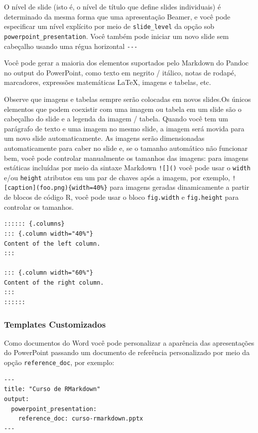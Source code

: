 \documentclass[
]{book}
\begin{document}
O nível de slide (isto é, o nível de título que define slides individuais) é determinado da mesma forma que uma apresentação Beamer, e você pode especificar um nível explícito por meio de \texttt{slide\_level} da opção sob \texttt{powerpoint\_presentation}. Você também pode iniciar um novo slide sem cabeçalho usando uma régua horizontal \texttt{-\/-\/-}

Você pode gerar a maioria dos elementos suportados pelo Markdown do Pandoc no output do PowerPoint, como texto em negrito / itálico, notas de rodapé, marcadores, expressões matemáticas LaTeX, imagens e tabelas, etc.

Observe que imagens e tabelas sempre serão colocadas em novos slides.Os únicos elementos que podem coexistir com uma imagem ou tabela em um slide são o cabeçalho do slide e a legenda da imagem / tabela. Quando você tem um parágrafo de texto e uma imagem no mesmo slide, a imagem será movida para um novo slide automaticamente. As imagens serão dimensionadas automaticamente para caber no slide e, se o tamanho automático não funcionar bem, você pode controlar manualmente os tamanhos das imagens: para imagens estáticas incluídas por meio da sintaxe Markdown \texttt{!{[}{]}()} você pode usar o \texttt{width} e/ou \texttt{height} atributos em um par de chaves após a imagem, por exemplo, \texttt{!{[}caption{]}(foo.png)\{width=40\%\}} para imagens geradas dinamicamente a partir de blocos de código R, você pode usar o bloco \texttt{fig.width} e \texttt{fig.height} para controlar os tamanhos.

\begin{verbatim}
:::::: {.columns}
::: {.column width="40%"}
Content of the left column.
:::

::: {.column width="60%"}
Content of the right column.
:::
::::::
\end{verbatim}

\hypertarget{templates-customizados}{%
\subsubsection*{Templates Customizados}\label{templates-customizados}}

Como documentos do Word você pode personalizar a aparência das apresentações do PowerPoint passando um documento de referência personalizado por meio da opção \texttt{reference\_doc}, por exemplo:

\begin{verbatim}
---
title: "Curso de RMarkdown"
output:
  powerpoint_presentation:
    reference_doc: curso-rmarkdown.pptx
---
\end{verbatim}
\end{document}
